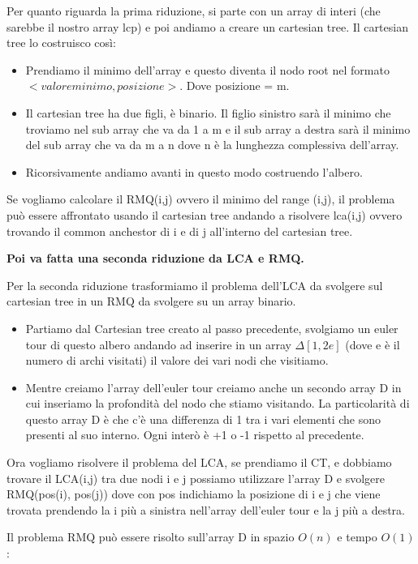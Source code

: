 \documentclass[12pt]{article}
\begin{document}
Per quanto riguarda la prima riduzione, si parte con un array di interi (che sarebbe il nostro array lcp) e poi andiamo a creare un cartesian tree. Il cartesian tree lo costruisco così:
\begin{itemize}
\item Prendiamo il minimo dell'array e questo diventa il nodo root nel formato $<valore minimo, posizione>$. Dove posizione = m.
\item Il cartesian tree ha due figli, è binario. Il figlio sinistro sarà il minimo che troviamo nel sub array che va da 1 a m e il sub array a destra sarà il minimo del sub array che va da m a n dove n è la lunghezza complessiva dell'array.
\item Ricorsivamente andiamo avanti in questo modo costruendo l'albero.
\end{itemize}

Se vogliamo calcolare il RMQ(i,j) ovvero il minimo del range (i,j), il problema può essere affrontato usando il cartesian tree andando a risolvere lca(i,j) ovvero trovando il common anchestor di i e di j all'interno del cartesian tree.

\textbf{Poi va fatta una seconda riduzione da LCA e RMQ.}

Per la seconda riduzione trasformiamo il problema dell'LCA da svolgere sul cartesian tree in un RMQ da svolgere su un array binario.
\begin{itemize}
\item Partiamo dal Cartesian tree creato al passo precedente, svolgiamo un euler tour di questo albero andando ad inserire in un array $\Delta[1,2e]$ (dove e è il numero di archi visitati) il valore dei vari nodi che visitiamo.
\item Mentre creiamo l'array dell'euler tour creiamo anche un secondo array D in cui inseriamo la profondità del nodo che stiamo visitando.
La particolarità di questo array D è che c'è una differenza di 1 tra i vari elementi che sono presenti al suo interno. Ogni interò è +1 o -1 rispetto al precedente.
\end{itemize}

Ora vogliamo risolvere il problema del LCA, se prendiamo il CT, e dobbiamo trovare il LCA(i,j) tra due nodi i e j possiamo utilizzare l'array D e svolgere RMQ(pos(i), pos(j)) dove con pos indichiamo la posizione di i e j che viene trovata prendendo la i più a sinistra nell'array dell'euler tour e la j più a destra.

Il problema RMQ può essere risolto sull'array D in spazio $O(n)$ e tempo $O(1)$:
\end{document}
